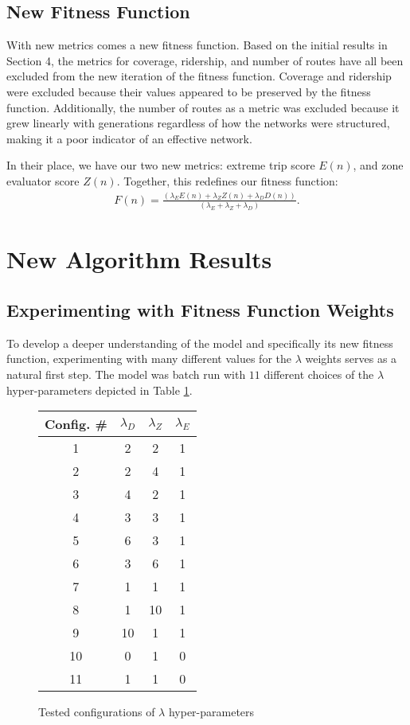 \documentclass[11pt]{amsart}
\theoremstyle{definition}                  %
\theoremstyle{remark}                       %
\numberwithin{equation}{section}
\begin{document}
\subsection{New Fitness Function}
With new metrics comes a new fitness function. Based on the initial results in Section 4, the metrics for coverage, ridership, and number of routes have all been excluded from the new iteration of the fitness function. Coverage and ridership were excluded because their values appeared to be preserved by the fitness function. Additionally, the number of routes as a metric was excluded because it grew linearly with generations regardless of how the networks were structured, making it a poor indicator of an effective network. 

In their place, we have our two new metrics: extreme trip score $E(n)$, and zone evaluator score $Z(n)$. Together, this redefines our fitness function:
\begin{align*}
    F(n) = \frac{(\lambda_{E} E(n) + \lambda_{Z} Z(n) +\lambda_{D} D(n))}{(\lambda_{E} + \lambda_{Z} + \lambda_{D})}.
\end{align*}
\section{New Algorithm Results} 
\subsection{Experimenting with Fitness Function Weights}
To develop a deeper understanding of the model and specifically its new fitness function, experimenting with many different values for the $\lambda$ weights serves as a natural first step. The model was batch run with $11$ different choices of the $\lambda$ hyper-parameters depicted in Table \ref{table:batch-run-configs}.

\begin{figure}[h]
    \centering
    \begin{tabular}{|c|c|c|c|}
        \hline
        Config. \# & $\lambda_D$ & $\lambda_Z$ & $\lambda_E$ \\
         \hline
        1 & 2 & 2 & 1 \\
        2 & 2 & 4 & 1 \\
        3 & 4 & 2 & 1 \\ 
        4 & 3 & 3 & 1 \\ 
        5 & 6 & 3 & 1 \\ 
        6 & 3 & 6 & 1 \\ 
        7 & 1 & 1 & 1 \\
        8 & 1 & 10 & 1 \\ 
        9 & 10 & 1 & 1 \\
        10 & 0 & 1 & 0 \\ 
        11 & 1 & 1 & 0 \\
        \hline
    \end{tabular}
    \caption{Tested configurations of $\lambda$ hyper-parameters}
    \label{table:batch-run-configs}
\end{figure}
\end{document}
